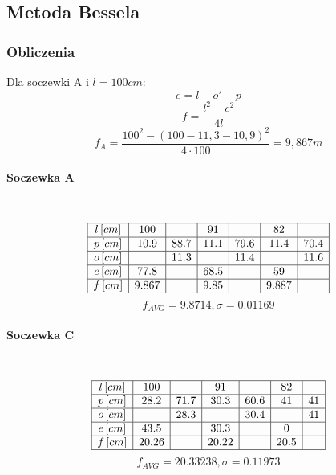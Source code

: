 \documentclass[a4paper, 11pt]{article}
\begin{document}

\subsection{Metoda Bessela}

\subsubsection{Obliczenia}\label{sec:obliczenia} %

Dla soczewki A i $l = 100cm$:
\[
	e = l - o' - p
\]
\[
	f = \frac{l^2 - e^2}{4l}
\]
\[
	f_A = \frac{100^2 - (100 - 11,3 - 10,9)^2}{4 \cdot 100} = 9,867 m
\]

\paragraph{Soczewka A}\label{par:soczewka_a} %
\mbox{} \\
\[
	\begin{array}{|c|c|c|c|c|c|c|c|c|}
		\hline
		l \, [cm] & 100   & ~    & 91   & ~    & 82    & ~    \\ \hline
		p \, [cm] & 10.9  & 88.7 & 11.1 & 79.6 & 11.4  & 70.4 \\ \hline
		o \, [cm] & ~     & 11.3 & ~    & 11.4 & ~     & 11.6 \\ \hline
		e \, [cm] & 77.8  & ~    & 68.5 & ~    & 59    & ~    \\ \hline
		f \, [cm] & 9.867 & ~    & 9.85 & ~    & 9.887 & ~    \\ \hline
	\end{array}
\]
$$f_{AVG} = 9.8714 , \sigma = 0.01169 $$


\paragraph{Soczewka C}\label{par:soczewka_c} %
\mbox{} \\
\[
	\begin{array}{|c|c|c|c|c|c|c|c|c|}
		\hline
		l \, [cm] & 100   & ~    & 91    & ~    & 82   & ~  \\ \hline
		p \, [cm] & 28.2  & 71.7 & 30.3  & 60.6 & 41   & 41 \\ \hline
		o \, [cm] & ~     & 28.3 & ~     & 30.4 & ~    & 41 \\ \hline
		e \, [cm] & 43.5  & ~    & 30.3  & ~    & 0    & ~  \\ \hline
		f \, [cm] & 20.26 & ~    & 20.22 & ~    & 20.5 & ~  \\ \hline
	\end{array}
\]
$$f_{AVG} = 20.33238 , \sigma = 0.11973 $$
\end{document}
